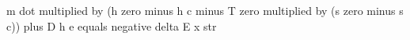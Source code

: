 m dot multiplied by (h zero minus h c minus T zero multiplied by (s zero minus s c)) plus D h e equals negative delta E x str